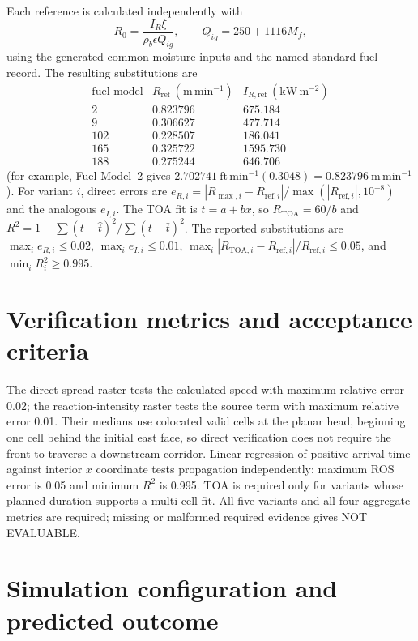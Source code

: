 Each reference is calculated independently with
\[
 R_0=\frac{I_R\xi}{\rho_b\epsilon Q_{ig}},\qquad
 Q_{ig}=250+1116M_f,
\]
using the generated common moisture inputs and the named standard-fuel
record.  The resulting substitutions are
\[
\begin{array}{c|cc}
\text{fuel model}&R_{\mathrm{ref}}~(\mathrm{m\,min^{-1}})
&I_{R,\mathrm{ref}}~(\mathrm{kW\,m^{-2}})\\\hline
2&0.823796&675.184\\
9&0.306627&477.714\\
102&0.228507&186.041\\
165&0.325722&1595.730\\
188&0.275244&646.706
\end{array}
\]
(for example, Fuel Model~2 gives
\(2.702741~\mathrm{ft\,min^{-1}}(0.3048)=0.823796~\mathrm{m\,min^{-1}}\)).
For variant \(i\), direct errors are
\(e_{R,i}=|R_{\max,i}-R_{\mathrm{ref},i}|/
\max(|R_{\mathrm{ref},i}|,10^{-8})\) and the analogous \(e_{I,i}\).
The TOA fit is \(t=a+bx\), so \(R_{\mathrm{TOA}}=60/b\) and
\(R^2=1-\sum(t-\hat t)^2/\sum(t-\bar t)^2\).
The reported substitutions are
\(\max_i e_{R,i}\leq0.02\), \(\max_i e_{I,i}\leq0.01\),
\(\max_i|R_{\mathrm{TOA},i}-R_{\mathrm{ref},i}|/
R_{\mathrm{ref},i}\leq0.05\), and \(\min_iR_i^2\geq0.995\).

\section{Verification metrics and acceptance criteria}
The direct spread raster tests the calculated speed with maximum relative error 0.02; the reaction-intensity raster tests the source term with maximum relative error 0.01.  Their medians use colocated valid cells at the planar head, beginning one cell behind the initial east face, so direct verification does not require the front to traverse a downstream corridor. Linear regression of positive arrival time against interior $x$ coordinate tests propagation independently: maximum ROS error is 0.05 and minimum $R^2$ is 0.995. TOA is required only for variants whose planned duration supports a multi-cell fit. All five variants and all four aggregate metrics are required; missing or malformed required evidence gives NOT EVALUABLE.

\section{Simulation configuration and predicted outcome}

